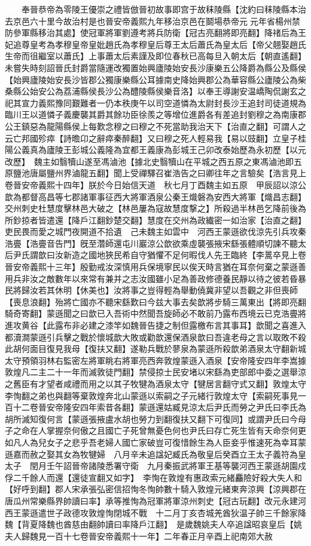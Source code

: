 　　奉晉恭帝為零陵王優崇之禮皆倣晉初故事即宫于故秣陵縣【沈約曰秣陵縣本治去京邑六十里今故治村是也晉安帝義熙九年移治京邑在鬬場恭帝元元年省楊州禁防參軍縣移治其處】使冠軍將軍劉遵考將兵防衛【冠古亮翻將即亮翻】降禇后為王妃追尊皇考為孝穆皇帝皇妣趙氏為孝穆皇后尊王太后蕭氏為皇太后【帝父翹娶趙氏生帝而徂繼室以蕭氏】上事蕭太后素謹及即位春秋已高每旦入朝太后【朝直遙翻】未嘗失時刻詔晉氏封爵當隨運改獨置始興廬陵始安長沙康樂五公降爵為縣公及縣侯【始興廬陵始安長沙皆郡公獨康樂縣公耳據南史降始興郡公為華容縣公廬陵公為柴桑縣公始安公為荔浦縣侯長沙公為醴陵縣侯樂音洛】以奉王導謝安温嶠陶侃謝玄之祀其宣力義熙豫同艱難者一仍本秩庚午以司空道憐為太尉封長沙王追封司徒道規為臨川王以道憐子義慶襲其爵其餘功臣徐羨之等增位進爵各有差追封劉穆之為南康郡公王鎮惡為龍陽縣侯上每歎念穆之曰穆之不死當助我治天下【治直之翻】可謂人之云亡邦國殄瘁【詩曕卬之辭瘁秦醉翻】又曰穆之死人輕易我【易以豉翻】立皇子桂陽公義真為廬陵王彭城公義隆為宜都王義康為彭城王己卯改泰始歷為永初歷【以元改歷】　魏主如翳犢山遂至馮滷池【據北史翳犢山在平城之西五原之東馮滷池即五原鹽池唐屬鹽州界滷龍五翻】聞上受禪驛召崔浩告之曰卿往年之言驗矣【浩言見上卷晉安帝義熙十四年】朕於今日始信天道　秋七月丁酉魏主如五原　甲辰詔以涼公歆為都督高昌等七郡諸軍事征西大將軍酒泉公秦王熾磐為安西大將軍【熾昌志翻】　交州刺史杜慧度擊林邑大破之【林邑屢為寇故慧度撃之】所殺過半林邑乞降前後為所鈔掠者皆遣還【降戶江翻鈔楚交翻】慧度在交州為政纎密一如治家【治直之翻】吏民畏而愛之城門夜開道不拾遺　己未魏主如雲中　河西王蒙遜欲伐涼先引兵攻秦浩亹【浩亹音告門】旣至濳師還屯川巖涼公歆欲乘虛襲張掖宋繇張體順切諫不聽太后尹氏謂歆曰汝新造之國地狹民希自守猶懼不足何暇伐人先王臨終【李暠卒見上卷晉安帝義熙十三年】殷勤戒汝深慎用兵保境寧民以俟天時言猶在耳奈何棄之蒙遜善用兵非汝之敵數年以來常有兼并之志汝國雖小足為善政修德養民靜以待之彼若昏暴民將歸汝若其休明【休美也】汝將事之豈得輕為舉動僥冀非望以吾觀之非但喪師【喪息浪翻】殆將亡國亦不聽宋繇歎曰今兹大事去矣歆將步騎三萬東出【將即亮翻騎奇寄翻】蒙遜聞之曰歆已入吾術中然聞吾旋師必不敢前乃露布西境云已克浩亹將進攻黄谷【此露布非必建之漆竿如魏晉告捷之制但露檄布言其事耳】歆聞之喜進入都瀆澗蒙遜引兵擊之戰於懷城歆大敗或勸歆還保酒泉歆曰吾違老母之言以取敗不殺此胡何面目復見我母【復扶又翻】遂勒兵戰於蓼泉為蒙遜所殺歆弟酒泉太守翻新城太守預領羽林右監密左將軍眺右將軍亮西奔敦煌蒙遜入酒泉【安帝隆安四年李嵩據敦煌凡二主二十一年而滅敦徒門翻】禁侵掠士民安堵以宋繇為吏部郎中委之選舉涼之舊臣有才望者咸禮而用之以其子牧犍為酒泉太守【犍居言翻守式又翻】敦煌太守李恂翻之弟也與翻等棄敦煌奔北山蒙遜以索嗣之子元緒行敦煌太守【索嗣死事見一百十二卷晉安帝隆安四年索昔各翻】蒙遜還姑臧見涼太后尹氏而勞之尹氏曰李氏為胡所滅知復何言【蒙遜張掖盧水胡也勞力到翻復扶又翻下可復同】或謂尹氏曰今母子之命在人掌握奈何傲之且國亡子死曾無憂色何也尹氏曰存亡死生皆有天命奈何更如凡人為兒女子之悲乎吾老婦人國亡家破豈可復惜餘生為人臣妾乎惟速死為幸耳蒙遜嘉而赦之娶其女為牧犍婦　八月辛未追諡妃臧氏為敬皇后癸酉立王太子義符為皇太子　閏月壬午詔晉帝諸陵悉署守衛　九月秦振武將軍王基等襲河西王蒙遜胡園戍俘二千餘人而還【還徒宣翻又如字】　李恂在敦煌有惠政索元緒麤險好殺大失人和【好呼到翻】郡人宋承張弘密信招恂冬恂帥數十騎入敦煌元緒東奔涼興【涼興郡在唐瓜州常樂縣界帥讀曰率】承等推恂為冠軍將軍涼州刺史【冠古玩翻】改元永建河西王蒙遜遣世子政德攻敦煌恂閉城不戰　十二月丁亥杏城羌酋狄温子帥三千餘家降魏【背夏降魏也酋慈由翻帥讀曰率降戶江翻】　是歲魏姚夫人卒追諡昭哀皇后【姚夫人歸魏見一百十七卷晉安帝義熙十一年】二年春正月辛酉上祀南郊大赦

